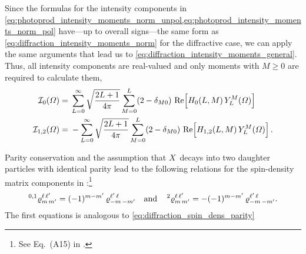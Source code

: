 Since the formulas for the intensity components in
\cref{eq:photoprod_intensity_moments_norm_unpol,eq:photoprod_intensity_moments_norm_pol}
have---up to overall signs---the same form as
\cref{eq:diffraction_intensity_moments_norm} for the diffractive case,
we can apply the same arguments that lead us to
\cref{eq:diffraction_intensity_moments_general}.  Thus, all intensity
components are real-valued and only moments with $M \geq 0$ are
required to calculate them, \ie
\begin{align}
  \label{eq:photoprod_intensity_moments_unpol_general}
  \intensity_0(\Omega)
  ={}& \sum_{L = 0}^\infty \sqrt{\frac{2 L + 1}{4 \pi}} \sum_{M = 0}^{L} (2 - \delta_{M 0})\, \Re{H_0(L, M)\, Y_L^M(\Omega)}
  \\
  \label{eq:photoprod_intensity_moments_pol_general}
  \intensity_{1, 2}(\Omega)
  ={}& -\sum_{L = 0}^\infty \sqrt{\frac{2 L + 1}{4 \pi}} \sum_{M = 0}^{L} (2 - \delta_{M 0})\, \Re{H_{1, 2}(L, M)\, Y_L^M(\Omega)}.
\end{align}

Parity conservation and the assumption that $X$~decays into two
daughter particles with identical parity lead to the following
relations for the spin-density matrix components in
:\footnote{See
Eq.~(A15) in .}
\begin{equation}
  \label{eq:photoprod_spin_dens_parity}
  \prescript{0, 1}{}{\varrho}^{\ell\, \ell'}_{m\, m'}
  = (-1)^{m - m'}\, \varrho^{\ell'\, \ell}_{{-m}\, {-m'}}
  \quad\text{and}\quad
  \prescript{2}{}{\varrho}^{\ell\, \ell'}_{m\, m'}
  = -(-1)^{m - m'}\, \varrho^{\ell'\, \ell}_{{-m}\, {-m'}}.
\end{equation}
The first equations is analogous to
\cref{eq:diffraction_spin_dens_parity}

